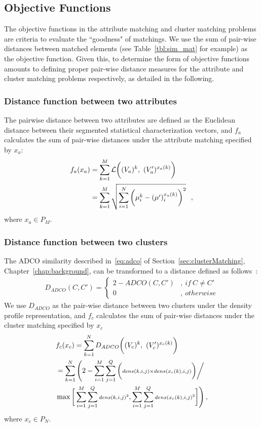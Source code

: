 \subsection{Objective Functions}
\label{sec:obj_funcs}
The objective functions in the attribute matching and cluster matching problems are criteria to evaluate the ``goodness" of matchings. We use the sum of pair-wise distances between matched elements (see Table~\ref{tbl:sim_mat} for example) as the objective function. Given this, to determine the form of objective functions amounts to defining proper pair-wise distance measures for the attribute and cluster matching problems respectively, as detailed in the following.


\subsubsection{Distance function between two attributes}
The pairwise distance between two attributes are defined as the Euclidean distance between their segmented statistical characterization vectors, and $f_a$ calculates the sum of pair-wise distances under the attribute matching specified by $x_a$:
\begin{align}
\notag f_a(x_a)&=\sum_{k=1}^M\mathcal{L}\bigg((V_a)^k,~(V_a')^{x_a(k)}\bigg)\\
&=\sum_{k=1}^M\sqrt{\sum_{i=1}^N\bigg(\mu^{k}_i-(\mu')^{x_a(k)}_i\bigg)^2} \label{eq:calc_L_mm} ~~ ,
\end{align}
where $x_a \in P_M$.

\subsubsection{Distance function between two clusters}

The ADCO similarity described in~\ref{eq:adco} of Section~\ref{sec:clusterMatching}, Chapter~\ref{chap:background}, can be transformed to a distance defined as follows~\cite{Bae2010}:
\begin{align}
D_{ADCO}(C,C')=\left\{\begin{array}{ll}
	   { 2-ADCO(C,C')} &, { ~if~ C \neq C'}\\
	   { 0} &, ~{ otherwise}
	   \end{array}\right.
\end{align}
We use $D_{ADCO}$ as the pair-wise distance between two clusters under the density profile representation, and $f_c$ calculates the sum of pair-wise distances under the cluster matching specified by $x_c$
\begin{align}
\notag &f_c(x_c)=\sum_{k=1}^N D_{ADCO} \bigg((V_c)^k,~(V_c')^{x_c(k)}\bigg)\\
\notag &=\sum_{k=1}^N\Bigg(2- \sum_{i=1}^M\sum_{j=1}^Q\bigg({\scriptstyle dens(k,i,j)\times dens(x_c(k),i,j)\bigg) \bigg/ }\\ &\max{\bigg[\sum_{i=1}^M\sum_{j=1}^Q {\scriptstyle dens(k,i,j)^2},\sum_{i=1}^M\sum_{j=1}^Q {\scriptstyle dens(x_c(k),i,j)^2}\bigg]}\Bigg) \label{eq:calc_L_mm} \, ,
\end{align}
where $x_c \in P_N$.

